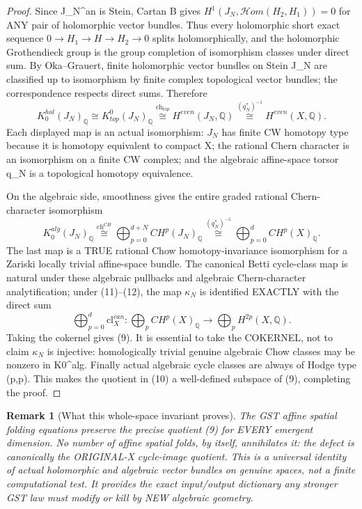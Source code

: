 \documentclass[11pt]{article}
\newtheorem{remark}[theorem]{Remark}
\begin{document}
\begin{proof}
Since J_N^{an} is Stein, Cartan B gives
$H^1(J_N,\mathcal Hom(H_2,H_1))=0$
for ANY pair of holomorphic vector bundles.
Thus every holomorphic short exact sequence
$0\to H_1\to H\to H_2\to0$ splits
holomorphically, and the holomorphic Grothendieck
group is the group completion of isomorphism classes
under direct sum. By Oka--Grauert,
finite holomorphic vector bundles on Stein J_N
are classified up to isomorphism by
finite complex topological vector bundles;
the correspondence respects direct sums.
Therefore
\[
 K_0^{hol}(J_N)_{\mathbb Q}
    \cong K^0_{top}(J_N)_{\mathbb Q}
    \overset{\operatorname{ch}_{top}}\cong
           H^{even}(J_N,\mathbb Q)
    \overset{(q_N^*)^{-1}}\cong
           H^{even}(X,\mathbb Q).
 \tag{11}
\]
Each displayed map is an actual isomorphism:
$J_N$ has finite CW homotopy type
because it is homotopy equivalent to compact X;
the rational Chern character is an isomorphism
on a finite CW complex; and the
algebraic affine-space torsor q_N is a
topological homotopy equivalence.

On the algebraic side, smoothness gives the
entire graded rational Chern-character isomorphism
\[
 K_0^{alg}(J_N)_{\mathbb Q}
 \overset{\operatorname{ch}^{CH}}\cong
          \bigoplus_{p=0}^{d+N}CH^p(J_N)_{\mathbb Q}
 \overset{(q_N^*)^{-1}}\cong
          \bigoplus_{p=0}^{d}CH^p(X)_{\mathbb Q}.
 \tag{12}
\]
The last map is a TRUE rational Chow
homotopy-invariance isomorphism for
a Zariski locally trivial affine-space bundle.
The canonical Betti cycle-class map is
natural under these algebraic pullbacks and
algebraic Chern-character analytification;
under (11)--(12), the map $\kappa_N$
is identified EXACTLY with the direct sum
\[
 \bigoplus_{p=0}^{d}
 \mathrm{cl}_X^{can}:
 \bigoplus_pCH^p(X)_{\mathbb Q}
   \longrightarrow
 \bigoplus_pH^{2p}(X,\mathbb Q).
\]
Taking the cokernel gives (9).
It is essential to take the COKERNEL,
not to claim $\kappa_N$ is injective:
homologically trivial genuine algebraic
Chow classes may be nonzero in K0^{alg}.
Finally actual algebraic cycle classes
are always of Hodge type (p,p).
This makes the quotient in (10)
a well-defined subspace of (9),
completing the proof.
\end{proof}

\begin{remark}[What this whole-space invariant proves]
The GST affine spatial folding equations
preserve the precise quotient (9)
for EVERY emergent dimension.
No number of affine spatial folds,
by itself, annihilates it: the defect is
canonically the ORIGINAL-X cycle-image
quotient. This is a universal identity
of actual holomorphic and algebraic
vector bundles on genuine spaces,
not a finite computational test.
It provides the exact input/output
dictionary any stronger GST law must
modify or kill by NEW algebraic geometry.
\end{remark}
\end{document}
